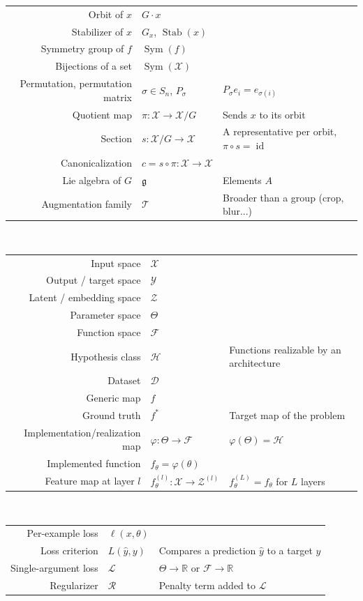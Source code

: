 \documentclass[mathematics,review,submit,moreauthors]{Definitions/mdpi}
\begin{document}
{\begin{tabularx}{\linewidth}{@{}N@{}}
Orbit of $x$ & $G\cdot x$ &  \\
Stabilizer of $x$ & $G_x$, $\operatorname{Stab}(x)$ & \\
Symmetry group of $f$ & $\operatorname{Sym}(f)$ & \\
Bijections of a set & $\operatorname{Sym}(\mathcal{X})$ & \\
Permutation, permutation matrix & $\sigma\in S_n$, $P_\sigma$ & ${P_\sigma e_i=e_{\sigma(i)}}$ \\
Quotient map & ${\pi:\mathcal{X}\to\mathcal{X}/G}$ & Sends $x$ to its orbit \\
Section & ${s:\mathcal{X}/G\to\mathcal{X}}$ & A representative per orbit, ${\pi\circ s=\operatorname{id}}$ \\
Canonicalization & ${c=s\circ\pi:\mathcal{X}\to\mathcal{X}}$ & \\
Lie algebra of $G$ & $\mathfrak{g}$ & Elements $A$ \\
Augmentation family & $\mathcal{T}$ & Broader than a group (crop, blur...) \\
\midrule
\end{tabularx}\\
\noindent
\begin{tabularx}{\linewidth}{@{}N@{}}
\midrule
Input space & $\mathcal{X}$ & \\
Output / target space & $\mathcal{Y}$ & \\
Latent / embedding space & $\mathcal{Z}$ & \\
Parameter space & $\Theta$ & \\
Function space & $\mathcal{F}$ & \\
Hypothesis class & $\mathcal{H}$ & Functions realizable by an architecture \\
Dataset & $\mathcal{D}$ & \\
Generic map & $f$ & \\
Ground truth & $f^*$ & Target map of the problem \\
Implementation/realization map & ${\varphi:\Theta\to\mathcal{F}}$ & ${\varphi(\Theta)=\mathcal{H}}$ \\
Implemented function & ${f_\theta=\varphi(\theta)}$ & \\
Feature map at layer $l$ & ${f_\theta^{(l)}:\mathcal{X}\to\mathcal{Z}^{(l)}}$ & ${f_\theta^{(L)}=f_\theta}$ for $L$ layers \\
\midrule
\end{tabularx}\\
\noindent
\begin{tabularx}{\linewidth}{@{}N@{}}
Per-example loss & $\ell(x,\theta)$ & \\
Loss criterion & $L(\hat y,y)$ & Compares a prediction $\hat y$ to a target $y$ \\
Single-argument loss & $\mathcal{L}$ & ${\Theta\to\mathbb{R}}$ or ${\mathcal{F}\to\mathbb{R}}$\\
Regularizer & $\mathcal{R}$ & Penalty term added to $\mathcal{L}$ \\
\bottomrule
\end{tabularx}}
\end{document}
